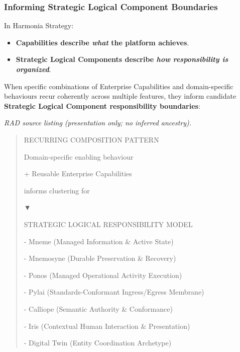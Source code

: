 \subsubsection*{Informing Strategic Logical Component Boundaries}
\label{rad:tier-model:156}

In Harmonia Strategy:

\label{rad:tier-model:157}

\begin{itemize}

\item
\textbf{Capabilities describe \emph{what} the platform achieves}.



\item
\textbf{Strategic Logical Components describe \emph{how responsibility is organized}}.



\end{itemize}
\label{rad:tier-model:160}

When specific combinations of Enterprise Capabilities and domain-specific behaviours recur coherently across multiple features, they inform candidate \textbf{Strategic Logical Component responsibility boundaries}:

\label{rad:tier-model:162}

\textit{RAD source listing (presentation only; no inferred ancestry).}
\begin{quote}
RECURRING COMPOSITION PATTERN

Domain-specific enabling behaviour

+ Reusable Enterprise Capabilities

informs clustering for

▼

STRATEGIC LOGICAL RESPONSIBILITY MODEL

- Mneme (Managed Information \& Active State)

- Mnemosyne (Durable Preservation \& Recovery)

- Ponos (Managed Operational Activity Execution)

- Pylai (Standards-Conformant Ingress/Egress Membrane)

- Calliope (Semantic Authority \& Conformance)

- Iris (Contextual Human Interaction \& Presentation)

- Digital Twin (Entity Coordination Archetype)
\end{quote}
\label{rad:tier-model:182}

